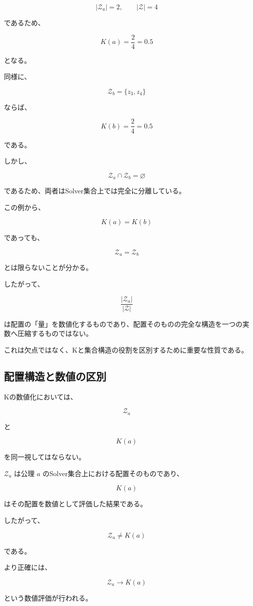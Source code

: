 \[
|\mathcal{Z}_a|=2,
\qquad
|\mathcal{Z}|=4
\]

であるため、

\[
K(a) = \frac{2}{4} = 0.5
\]

となる。

同様に、

\[
\mathcal{Z}_b = \{z_3,z_4\}
\]

ならば、

\[
K(b) = \frac{2}{4} = 0.5
\]

である。

しかし、

\[
\mathcal{Z}_a\cap\mathcal{Z}_b = \varnothing
\]

であるため、両者はSolver集合上では完全に分離している。

この例から、

\[
K(a)=K(b)
\]

であっても、

\[
\mathcal{Z}_a=\mathcal{Z}_b
\]

とは限らないことが分かる。

したがって、

\[
\frac{|\mathcal{Z}_a|}{|\mathcal{Z}|}
\]

は配置の「量」を数値化するものであり、配置そのものの完全な構造を一つの実数へ圧縮するものではない。

これは欠点ではなく、Kと集合構造の役割を区別するために重要な性質である。

\subsection{配置構造と数値の区別}

Kの数値化においては、

\[
\mathcal{Z}_a
\]

と

\[
K(a)
\]

を同一視してはならない。

$\mathcal{Z}_a$ は公理 $a$ のSolver集合上における配置そのものであり、

\[
K(a)
\]

はその配置を数値として評価した結果である。

したがって、

\[
\boxed{
\mathcal{Z}_a
\neq
K(a)
}
\]

である。

より正確には、

\[
\mathcal{Z}_a
\longrightarrow
K(a)
\]

という数値評価が行われる。

